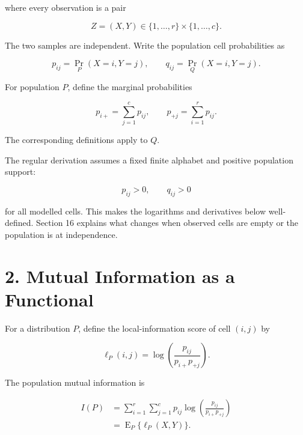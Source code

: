 \documentclass[
  11pt]{article}
\let\originalsection\section
\renewcommand{\section}{\clearpage\originalsection}
\begin{document}
where every observation is a pair

\begin{equation}
Z=(X,Y)\in\{1,\ldots,r\}\times\{1,\ldots,c\}.
\end{equation}

The two samples are independent. Write the population cell probabilities
as

\begin{equation}
p_{ij}=\Pr_P(X=i,Y=j),
\qquad
q_{ij}=\Pr_Q(X=i,Y=j).
\end{equation}

For population \(P\), define the marginal probabilities

\begin{equation}
p_{i+}=\sum_{j=1}^{c}p_{ij},
\qquad
p_{+j}=\sum_{i=1}^{r}p_{ij}.
\end{equation}

The corresponding definitions apply to \(Q\).

The regular derivation assumes a fixed finite alphabet and positive
population support:

\begin{equation}
p_{ij}>0,
\qquad
q_{ij}>0
\end{equation}

for all modelled cells. This makes the logarithms and derivatives below
well-defined. Section 16 explains what changes when observed cells are
empty or the population is at independence.

\section{2. Mutual Information as a
Functional}\label{mutual-information-as-a-functional}

For a distribution \(P\), define the local-information score of cell
\((i,j)\) by

\begin{equation}
\ell_P(i,j)
=\log\left(\frac{p_{ij}}{p_{i+}p_{+j}}\right).
\end{equation}

The population mutual information is

\begin{equation}
\begin{aligned}
I(P)
&=\sum_{i=1}^{r}\sum_{j=1}^{c}
p_{ij}\log\left(\frac{p_{ij}}{p_{i+}p_{+j}}\right)\\
&=\operatorname E_P\{\ell_P(X,Y)\}.
\end{aligned}
\end{equation}
\end{document}
